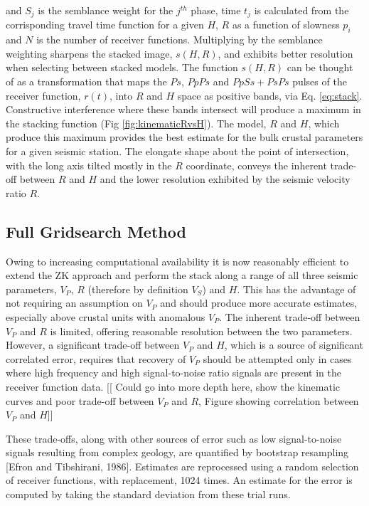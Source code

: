 \documentclass[draft, 12pt]{article}
\begin{document}
and $S_j$ is the semblance weight for the $j^{th}$ phase, time $t_j$ is calculated from the corrisponding travel time function for a given $H$, $R$ as a function of slowness $p_i$ and $N$ is the number of receiver functions. Multiplying by the semblance weighting sharpens the stacked image, $s(H,R)$, and exhibits better resolution when selecting between stacked models. The function $s(H,R)$ can be thought of as a transformation that maps the $Ps$, $PpPs$ and $PpSs+PsPs$ pulses of the receiver function, $r(t)$,  into $R$ and $H$ space as positive bands, via Eq. \ref{eq:stack}. Constructive interference where these bands intersect will produce a maximum in the stacking function (Fig \ref{fig:kinematicRvsH}). The model, $R$ and $H$, which produce this maximum provides the best estimate for the bulk crustal parameters for a given seismic station. The elongate shape about the point of intersection, with the long axis tilted mostly in the $R$ coordinate, conveys the inherent trade-off between $R$ and $H$ and the lower resolution exhibited by the seismic velocity ratio $R$.

\subsection{Full Gridsearch Method}

  Owing to increasing computational availability it is now reasonably efficient to extend the ZK approach and perform the stack along a range of all three seismic parameters, $V_P$, $R$ (therefore by definition $V_S$) and $H$. This has the advantage of not requiring an assumption on $V_P$ and should produce more accurate estimates, especially above crustal units with anomalous $V_P$. The inherent trade-off between $V_P$ and $R$ is limited, offering reasonable resolution between the two parameters. However, a significant trade-off between $V_P$ and $H$, which is a source of significant correlated error, requires that recovery of $V_P$ should be attempted only in cases where high frequency and high signal-to-noise ratio signals are present in the receiver function data. [[ Could go into more depth here, show the kinematic curves and poor trade-off between $V_P$ and $R$, Figure showing correlation between $V_P$ and $H$]]

  These trade-offs, along with other sources of error such as low signal-to-noise signals resulting from complex geology, are quantified by bootstrap resampling [Efron and Tibshirani, 1986]. Estimates are reprocessed using a random selection of receiver functions, with replacement, 1024 times. An estimate for the error is computed by taking the standard deviation from these trial runs.
\end{document}
